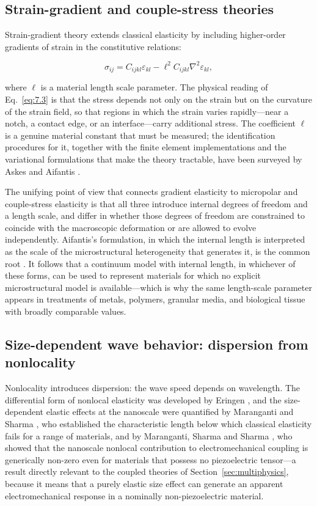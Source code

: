\subsection{Strain-gradient and couple-stress theories}
\label{sec:7.2}

Strain-gradient theory extends classical elasticity by including higher-order gradients of strain in the constitutive relations:

\begin{equation}
\sigma_{ij} = C_{ijkl}\varepsilon_{kl} - \ell^2 C_{ijkl}\nabla^2\varepsilon_{kl},
\label{eq:7.3}
\end{equation}

where $\ell$ is a material length scale parameter. The physical reading of Eq.~\eqref{eq:7.3} is that the stress depends not only on the strain but on the curvature of the strain field, so that regions in which the strain varies rapidly---near a notch, a contact edge, or an interface---carry additional stress. The coefficient $\ell$ is a genuine material constant that must be measured; the identification procedures for it, together with the finite element implementations and the variational formulations that make the theory tractable, have been surveyed by Askes and Aifantis \cite{Askes2006,Askes2011}.

The unifying point of view that connects gradient elasticity to micropolar and couple-stress elasticity is that all three introduce internal degrees of freedom and a length scale, and differ in whether those degrees of freedom are constrained to coincide with the macroscopic deformation or are allowed to evolve independently. Aifantis's formulation, in which the internal length is interpreted as the scale of the microstructural heterogeneity that generates it, is the common root \cite{Askes2006}. It follows that a continuum model with internal length, in whichever of these forms, can be used to represent materials for which no explicit microstructural model is available---which is why the same length-scale parameter appears in treatments of metals, polymers, granular media, and biological tissue with broadly comparable values.

\subsection{Size-dependent wave behavior: dispersion from nonlocality}
\label{sec:7.3}

Nonlocality introduces dispersion: the wave speed depends on wavelength. The differential form of nonlocal elasticity was developed by Eringen \cite{Eringen1983}, and the size-dependent elastic effects at the nanoscale were quantified by Maranganti and Sharma \cite{Maranganti2007}, who established the characteristic length below which classical elasticity fails for a range of materials, and by Maranganti, Sharma and Sharma \cite{Maranganti2006}, who showed that the nanoscale nonlocal contribution to electromechanical coupling is generically non-zero even for materials that possess no piezoelectric tensor---a result directly relevant to the coupled theories of Section~\ref{sec:multiphysics}, because it means that a purely elastic size effect can generate an apparent electromechanical response in a nominally non-piezoelectric material.

